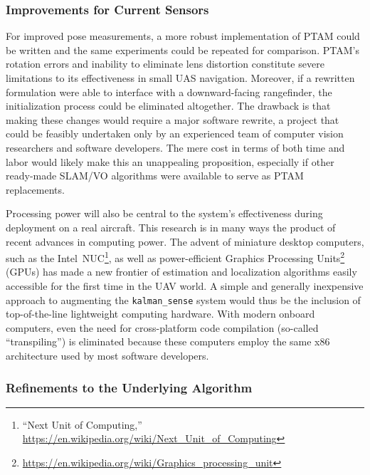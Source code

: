 \subsubsection{Improvements for Current Sensors}

For improved pose measurements, a more robust implementation of PTAM could be written and the same experiments could be repeated for comparison. PTAM's rotation errors and inability to eliminate lens distortion constitute severe limitations to its effectiveness in small UAS navigation. Moreover, if a rewritten formulation were able to interface with a downward-facing rangefinder, the initialization process could be eliminated altogether. The drawback is that making these changes would require a major software rewrite, a project that could be feasibly undertaken only by an experienced team of computer vision researchers and software developers. The mere cost in terms of both time and labor would likely make this an unappealing proposition, especially if other ready-made SLAM/VO algorithms were available to serve as PTAM replacements.

Processing power will also be central to the system's effectiveness during deployment on a real aircraft. This research is in many ways the product of recent advances in computing power. The advent of miniature desktop computers, such as the Intel~NUC\footnote{``Next Unit of Computing,'' \url{https://en.wikipedia.org/wiki/Next_Unit_of_Computing}}, as well as power-efficient Graphics Processing Units\footnote{\url{https://en.wikipedia.org/wiki/Graphics_processing_unit}} (GPUs) has made a new frontier of estimation and localization algorithms easily accessible for the first time in the UAV world. A simple and generally inexpensive approach to augmenting the \texttt{kalman\_sense} system would thus be the inclusion of top-of-the-line lightweight computing hardware. With modern onboard computers, even the need for cross-platform code compilation (so-called ``transpiling'') is eliminated because these computers employ the same x86 architecture used by most software developers.

\subsubsection{Refinements to the Underlying Algorithm}

